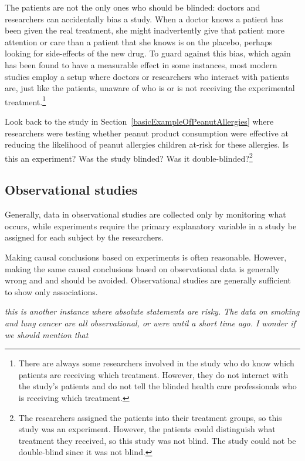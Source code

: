\begin{doublespace}
The patients are not the only ones who should be blinded: doctors and researchers can accidentally bias a study. When a doctor knows a patient has been given the real treatment, she might inadvertently give that patient more attention or care than a patient that she knows is on the placebo, perhaps looking for side-effects of the new drug. To guard against this bias, which again has been found to have a measurable effect in some instances, most modern studies employ a  setup where doctors or researchers who interact with patients are, just like the patients, unaware of who is or is not receiving the experimental treatment.\footnote{There are always some researchers involved in the study who do know which patients are receiving which treatment. However, they do not interact with the study's patients and do not tell the blinded health care professionals who is receiving which treatment.}

\begin{exercise}
	Look back to the study in Section~\ref{basicExampleOfPeanutAllergies} where researchers were testing whether peanut product consumption were effective at reducing the likelihood of peanut allergies children at-risk for these allergies. Is this an experiment? Was the study blinded? Was it double-blinded?\footnote{The researchers assigned the patients into their treatment groups, so this study was an experiment. However, the patients could distinguish what treatment they received, so this study was not blind. The study could not be double-blind since it was not blind.}
\end{exercise}



\subsection{Observational studies}

Generally, data in observational studies are collected only by monitoring what occurs, while experiments require the primary explanatory variable in a study be assigned for each subject by the researchers.

Making causal conclusions based on experiments is often reasonable. However, making the same causal conclusions based on observational data is generally wrong and and should be avoided. Observational studies are generally sufficient to show only associations.

\textit{this is another instance where absolute statements are risky.  The data on smoking and lung cancer are all observational, or were until a short time ago.  I wonder if we should mention that}


\end{doublespace}

